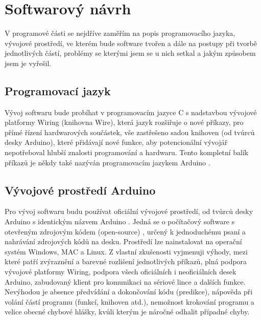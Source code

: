 \documentclass[FM,MP]{tulthesis}  %
\begin{document}

\chapter{Softwarový návrh}
V programové části se nejdříve zaměřím na popis programovacího jazyka, vývojové prostředí, ve kterém bude software tvořen a dále na postupy při tvorbě jednotlivých částí, problémy se kterými jsem se u nich setkal a jakým způsobem jsem je vyřešil.

\section{Programovací jazyk}
Vývoj softwaru bude probíhat v programovacím jazyce C s nadstavbou vývojové platformy Wiring  (knihovna Wire)\cite{Arduino acce}, která jazyk rozšiřuje o nové příkazy, pro přímé řízení hardwarových součástek, vše zastřešeno sadou knihoven \cite{Arduino lib} (od tvůrců desky Arduino), které přidávají nové funkce, aby potencionální vývojář nepotřeboval hlubší znalosti programování a hardwaru. Tento kompletní balík příkazů \cite{Arduino lang} je někdy také nazýván programovacím jazykem Arduino \cite{Arduino intro}.

\section{Vývojové prostředí Arduino}
Pro vývoj softwaru budu používat oficiální vývojové prostředí, od tvůrců desky Arduino s identickým názvem Arduino \cite{Arduino soft}. Jedná se o počítačový software s otevřeným zdrojovým kódem (open-source) \cite{Arduino source}, určený k jednoduchému psaní a nahrávání zdrojových kódů na desku. Prostředí lze nainstalovat na operační systém Windows, MAC a Linux. Z vlastní zkušenosti vyjmenuji výhody, mezi které patří zvýraznění a barevné rozlišení jednotlivých příkazů, plná podpora vývojové platformy Wiring, podpora všech oficiálních i neoficiálních desek Arduino, zabudovaný klient pro komunikaci na sériové lince a dalších funkce. Nevýhodou je absence předvídání a dokončování kódu (predikce), nápověda při volání částí programu (funkcí, knihoven atd.), nemožnost krokování programu a velice obecné chybové hlášky, kvůli kterým je náročné odhalit případné chyby.
\end{document}
